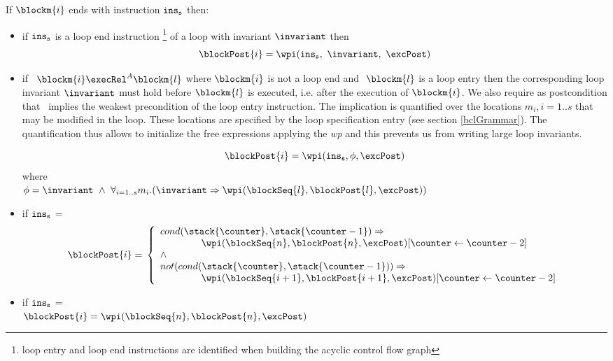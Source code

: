 \begin{defn}\label{post}
 If $\blockm{i}$ ends with instruction $\tt{ins}_s$ then:
 \begin{itemize} 

\item if  $\tt{ins}_s$ is a loop end instruction \footnote{loop entry and loop end instructions are identified when building the acyclic control flow graph} of a loop with invariant $\invariant$ then 
$$
\blockPost{i} =  \wpi( \tt{ins}_s, \ \invariant, \ \excPost ) 
$$

\item if \ $\blockm{i} \execRel^A \blockm{l}$ where $\blockm{i}$ is not a loop end and $\ \blockm{l}$ is a loop entry  then the corresponding loop invariant $\invariant$ must hold before $\blockm{l}$ is executed, i.e. after the execution of $\blockm{i}$. We also require as postcondition that \invariant \ implies the weakest precondition of the loop entry instruction. The implication is quantified over the locations $m_i , i= 1..s$ that may be modified in the loop. These locations are specified by the  loop specification entry (see section \ref{bclGrammar}). The quantification thus allows to initialize the free expressions applying the \textit{wp} and this prevents us from writing large loop invariants.

$$
\blockPost{i} = \wpi(\tt{ins}_s, \phi, \excPost) \\
$$
where \\
$
\phi = \invariant \ \wedge \ \forall_{i = 1..s} m_i.(
\invariant \Rightarrow \wpi(\blockSeq{l},\blockPost{l},\excPost))
$
  
 \item if  $\tt{ins}_s$ =   \\
$$
\blockPost{i} =  \\
\left\{
\begin{array}{l}
cond( \stack{\counter}, \stack{\counter - 1} )   \Rightarrow \\
\phantom{ \counter }   \wpi(\blockSeq{n}, \blockPost{n} ,\excPost )[ \counter \leftarrow \counter -2 ]  \\
\wedge \\
 not ( cond( \stack{\counter}, \stack{\counter - 1} )  )   \Rightarrow \\
\phantom{ \counter}    \wpi(\blockSeq{i+1}, \blockPost{i+1},\excPost ) [ \counter \leftarrow \counter -2 ]      \\                             
\end{array}
\right.
$$
\item if  $\tt{ins}_s$ =   \\ 
$\blockPost{i} =  \wpi(\blockSeq{n}, \blockPost{n} , \excPost )$ \\


\end{itemize}
\end{defn}

